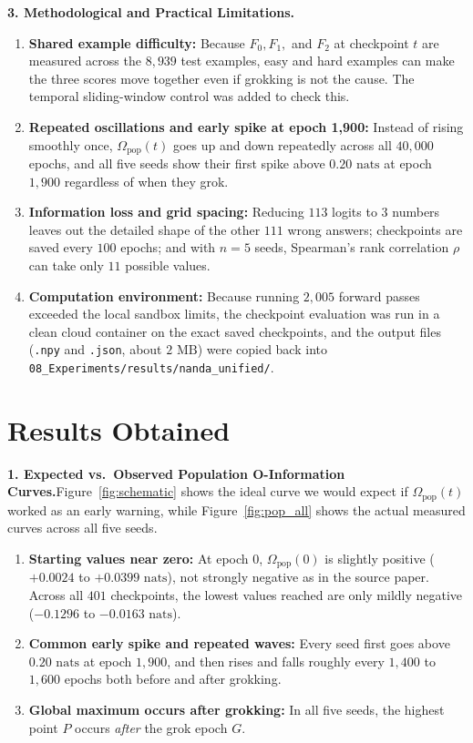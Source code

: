 \documentclass[11pt,a4paper,oneside]{report}
\newcommand{\Fzero}{F_{0}}
\newcommand{\Fone}{F_{1}}
\newcommand{\Ftwo}{F_{2}}
\newcommand{\Omegapop}{\Omega_{\mathrm{pop}}}
\begin{document}
\medskip
\noindent\textbf{3. Methodological and Practical Limitations.}
\begin{enumerate}[label=\textbf{(\roman*)}]
\item \textbf{Shared example difficulty:} Because $\Fzero, \Fone,$ and $\Ftwo$ at checkpoint $t$ are measured across the $8{,}939$ test examples, easy and hard examples can make the three scores move together even if grokking is not the cause. The temporal sliding-window control was added to check this.
\item \textbf{Repeated oscillations and early spike at epoch 1,900:} Instead of rising smoothly once, $\Omegapop(t)$ goes up and down repeatedly across all $40{,}000$ epochs, and all five seeds show their first spike above $0.20\text{ nats}$ at epoch $1{,}900$ regardless of when they grok.
\item \textbf{Information loss and grid spacing:} Reducing $113$ logits to $3$ numbers leaves out the detailed shape of the other $111$ wrong answers; checkpoints are saved every $100$ epochs; and with $n = 5$ seeds, Spearman's rank correlation $\rho$ can take only $11$ possible values.
\item \textbf{Computation environment:} Because running $2{,}005$ forward passes exceeded the local sandbox limits, the checkpoint evaluation was run in a clean cloud container on the exact saved checkpoints, and the output files (\texttt{.npy} and \texttt{.json}, about $2\text{ MB}$) were copied back into \texttt{08\_Experiments/results/nanda\_unified/}.
\end{enumerate}

\section{Results Obtained}

\noindent\textbf{1. Expected vs.\ Observed Population O-Information Curves.}\quad Figure~\ref{fig:schematic} shows the ideal curve we would expect if $\Omegapop(t)$ worked as an early warning, while Figure~\ref{fig:pop_all} shows the actual measured curves across all five seeds.
\begin{enumerate}[label=\textbf{(\roman*)}]
\item \textbf{Starting values near zero:} At epoch $0$, $\Omegapop(0)$ is slightly positive ($+0.0024$ to $+0.0399\text{ nats}$), not strongly negative as in the source paper. Across all $401$ checkpoints, the lowest values reached are only mildly negative ($-0.1296$ to $-0.0163\text{ nats}$).
\item \textbf{Common early spike and repeated waves:} Every seed first goes above $0.20\text{ nats}$ at epoch $1{,}900$, and then rises and falls roughly every $1{,}400$ to $1{,}600$ epochs both before and after grokking.
\item \textbf{Global maximum occurs after grokking:} In all five seeds, the highest point $P$ occurs \emph{after} the grok epoch $G$.
\end{enumerate}
\end{document}

